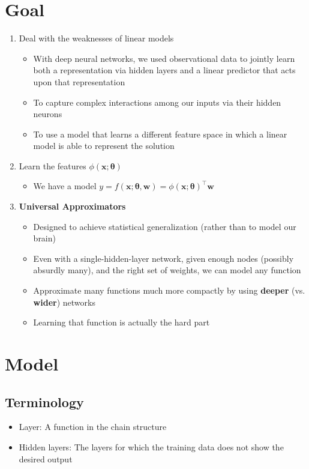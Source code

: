 \documentclass[12pt, a4paper]{article}
\def\vx{\boldsymbol{x}}
\def\vw{\boldsymbol{w}}
\def\vtheta{\boldsymbol{\theta}}
\begin{document}
\section{Goal}

    \begin{enumerate}
        \item Deal with the weaknesses of linear models
            \begin{itemize}
                \item With deep neural networks, we used observational data to jointly learn both a representation via hidden layers and a linear predictor that acts upon that representation
                \item To capture complex interactions among our inputs via their hidden neurons
                \item To use a model that learns a different feature space in which a linear model is able to represent the solution
            \end{itemize}
        \item Learn the features $\phi(\vx;\vtheta)$
            \begin{itemize}
                \item We have a model $y = f(\vx;\vtheta, \vw) = \phi(\vx;\vtheta)^\top \vw$
            \end{itemize}
        \item \textbf{Universal Approximators}
            \begin{itemize}
                \item Designed to achieve statistical generalization (rather than to model our brain)
                \item Even with a single-hidden-layer network, given enough nodes (possibly absurdly many), and the right set of weights, we can model any function
                \item Approximate many functions much more compactly by using \textbf{deeper} (vs. \textbf{wider}) networks
                \item Learning that function is actually the hard part
            \end{itemize}
    \end{enumerate}


\section{Model}

    \subsection{Terminology}
    \begin{itemize}
        \item Layer: A function in the chain structure
        \item Hidden layers: The layers for which the training data does not show the desired output
    \end{itemize}
\end{document}
